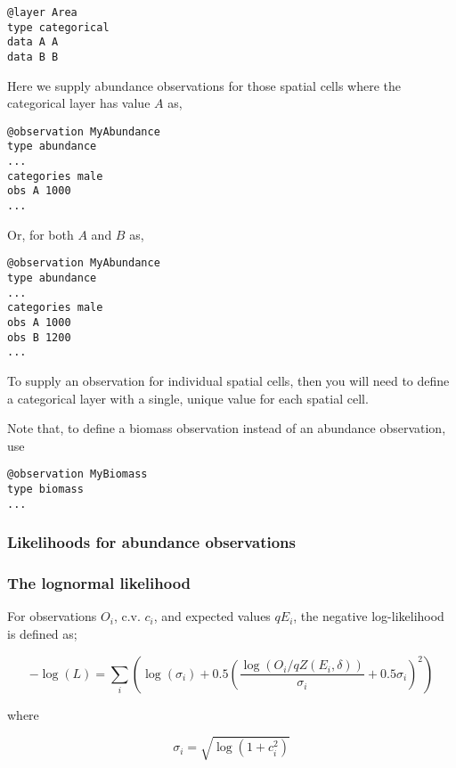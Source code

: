 {{{{{{{\small{\begin{verbatim}
@layer Area
type categorical
data A A 
data B B
\end{verbatim}}}

Here we supply abundance observations for those spatial cells where the categorical layer has value $A$ as, 

{\small{\begin{verbatim}
@observation MyAbundance
type abundance
...
categories male 
obs A 1000
...
\end{verbatim}}}

Or, for both $A$ and $B$ as,

{\small{\begin{verbatim}
@observation MyAbundance
type abundance
...
categories male
obs A 1000
obs B 1200
...
\end{verbatim}}}

To supply an observation for individual spatial cells, then you will need to define a categorical layer with a single, unique value for each spatial cell. 

Note that, to define a biomass observation instead of an abundance observation, use 

{\small{\begin{verbatim}
@observation MyBiomass
type biomass
...
\end{verbatim}}}

\subsubsection{Likelihoods for abundance observations}

\subsubsection*{The lognormal likelihood}

For observations $O_i$, c.v. $c_i$, and expected values $qE_i$, the negative log-likelihood is defined as;

\begin{equation}
 - \log \left(L \right) = \sum\limits_i \left( \log \left( \sigma _i \right) + 0.5\left( \frac{\log \left(O_i / q Z \left(E_i,\delta \right) \right)}{\sigma_i} + 0.5 \sigma_i \right)^2 \right)
\end{equation}

where 

\begin{equation}
  \sigma_i  = \sqrt{\log \left(1+c_i^2 \right)}
\end{equation}

}}}}}}
